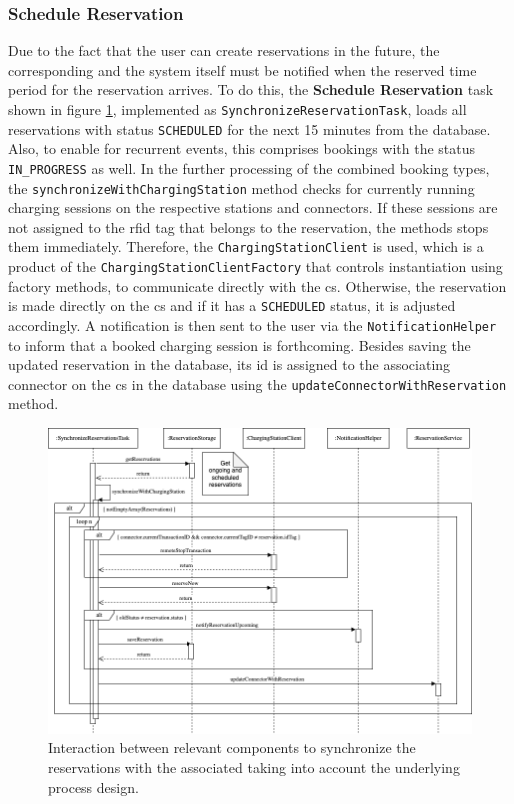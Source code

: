\subsubsection{Schedule Reservation}
\label{ch:Implementation:sec:Reservation System:ssec:Scheduling Capabilities:sssec:Schedule Reservation}

Due to the fact that the user can create reservations in the future, the corresponding  and the system itself must be notified when the reserved time period for the reservation arrives.
To do this, the \textbf{Schedule Reservation} task shown in figure \ref{fig:schedule-reservation-seqflow}, implemented as \texttt{SynchronizeReservationTask}, loads all reservations with status \texttt{SCHEDULED} for the next 15 minutes from the database.
Also, to enable for recurrent events, this comprises bookings with the status \texttt{IN\_PROGRESS} as well. 
In the further processing of the combined booking types, the \texttt{synchronizeWithChargingStation} method checks for currently running charging sessions on the respective stations and connectors. If these sessions are not assigned to the \acrshort{rfid} tag that belongs to the reservation, the methods stops them immediately.
Therefore, the \texttt{ChargingStationClient} is used, which is a product of the \texttt{ChargingStationClientFactory} that controls instantiation using factory methods, to communicate directly with the \acrshort{cs}.
Otherwise, the reservation is made directly on the \acrshort{cs} and if it has a \texttt{SCHEDULED} status, it is adjusted  accordingly. A notification is then sent to the user via the \texttt{NotificationHelper} to inform that a booked charging session is forthcoming.
Besides saving the updated reservation in the database, its \acrshort{id} is assigned to the associating connector on the \acrshort{cs} in the database using the \texttt{updateConnectorWithReservation} method.

\begin{figure}[h]
    \centering
    \includegraphics[scale=0.4]{resources/images/main/6_implementation/processes/scheduler/SynchronizeReservation.png}
    \caption{Interaction between relevant components to synchronize the reservations with the associated  taking into account the underlying process design.}
    \label{fig:schedule-reservation-seqflow}
\end{figure}

